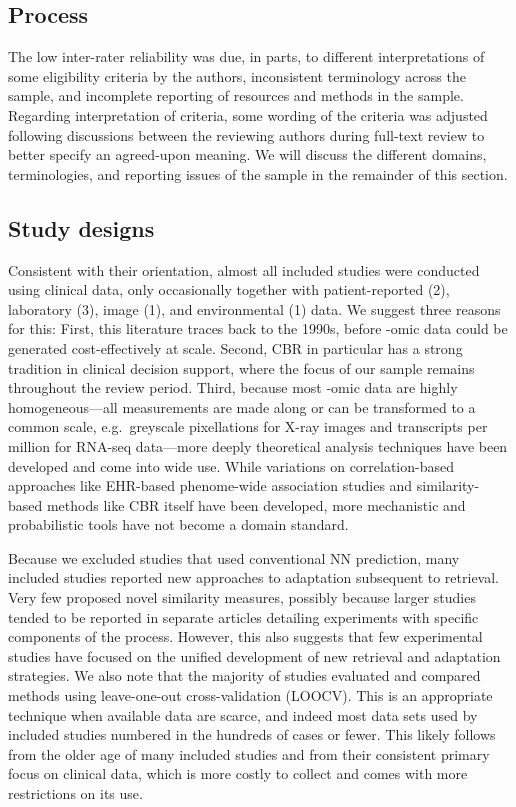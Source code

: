 \documentclass{article}
\begin{document}
\hypertarget{process}{%
\subsection{Process}\label{process}}

The low inter-rater reliability was due, in parts, to different
interpretations of some eligibility criteria by the authors,
inconsistent terminology across the sample, and incomplete reporting of
resources and methods in the sample. Regarding interpretation of
criteria, some wording of the criteria was adjusted following
discussions between the reviewing authors during full-text review to
better specify an agreed-upon meaning. We will discuss the different
domains, terminologies, and reporting issues of the sample in the
remainder of this section.

\hypertarget{study-designs}{%
\subsection{Study designs}\label{study-designs}}

Consistent with their orientation, almost all included studies were
conducted using clinical data, only occasionally together with
patient-reported (2), laboratory (3), image (1), and environmental (1)
data. We suggest three reasons for this: First, this literature traces
back to the 1990s, before -omic data could be generated cost-effectively
at scale. Second, CBR in particular has a strong tradition in clinical
decision support, where the focus of our sample remains throughout the
review period. Third, because most -omic data are highly
homogeneous---all measurements are made along or can be transformed to a
common scale, e.g.~greyscale pixellations for X-ray images and
transcripts per million for RNA-seq data---more deeply theoretical
analysis techniques have been developed and come into wide use. While
variations on correlation-based approaches like EHR-based phenome-wide
association studies and similarity-based methods like CBR itself have
been developed, more mechanistic and probabilistic tools have not become
a domain standard.

Because we excluded studies that used conventional NN prediction, many
included studies reported new approaches to adaptation subsequent to
retrieval. Very few proposed novel similarity measures, possibly because
larger studies tended to be reported in separate articles detailing
experiments with specific components of the process. However, this also
suggests that few experimental studies have focused on the unified
development of new retrieval and adaptation strategies. We also note
that the majority of studies evaluated and compared methods using
leave-one-out cross-validation (LOOCV). This is an appropriate technique
when available data are scarce, and indeed most data sets used by
included studies numbered in the hundreds of cases or fewer. This likely
follows from the older age of many included studies and from their
consistent primary focus on clinical data, which is more costly to
collect and comes with more restrictions on its use.
\end{document}
